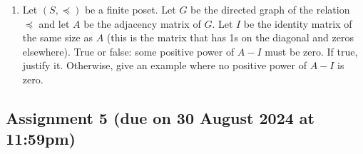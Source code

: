 \documentclass{amsart}
\begin{document}
\begin{enumerate}
\begin{verbatim}
A = matrix([[0,1,0],[0,1,1],[0,0,0]])
A^3
\end{verbatim}

\label{org15fa846}
\begin{verbatim}
[0 1 1]
[0 1 1]
[0 0 0]
\end{verbatim}

\item Let \((S, \preceq)\) be a finite poset.
Let \(G\) be the directed graph of the relation \(\preceq\) and let \(A\) be the adjacency matrix of \(G\).
Let \(I\) be the identity matrix of the same size as \(A\) (this is the matrix that has 1s on the diagonal and zeros elsewhere).
True or false: some positive power of \(A-I\) must be zero.
If true, justify it.
Otherwise, give an example where no positive power of \(A-I\) is zero.
\end{enumerate}
\subsection{Assignment 5 (due on 30 August 2024 at 11:59pm)}
\label{sec:org0e6447c}
\togglefalse{solutions}
\end{document}
